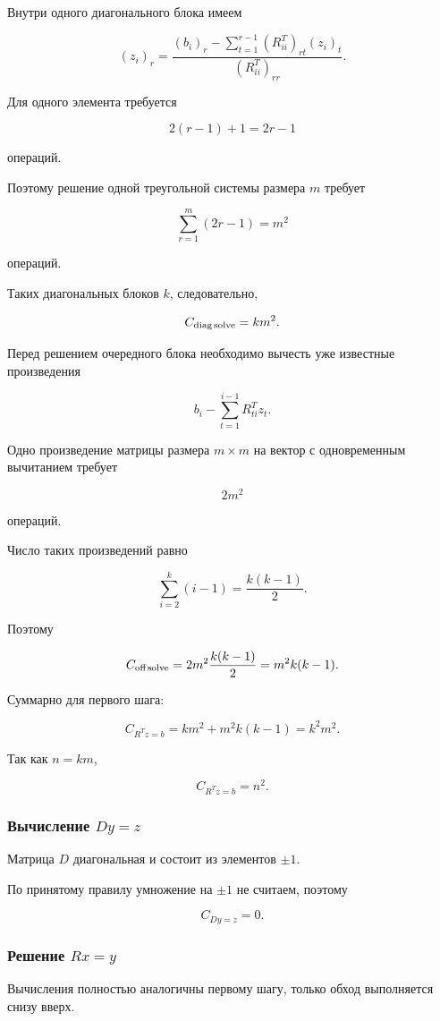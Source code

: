 \documentclass[a4paper,12pt]{article}
\begin{document}
Внутри одного диагонального блока имеем

$$
(z_i)_r
=
\frac{
  (b_i)_r
  -
  \sum_{t=1}^{r-1}
  (R_{ii}^T)_{rt}(z_i)_t
}{
  (R_{ii}^T)_{rr}
}.
$$

Для одного элемента требуется

$$
2(r-1)+1=2r-1
$$

операций.

Поэтому решение одной треугольной системы размера \(m\) требует

$$
\sum_{r=1}^{m}(2r-1)=m^2
$$

операций.

Таких диагональных блоков \(k\), следовательно,

$$
C_{\text{diag\,solve}}=km^2.
$$

Перед решением очередного блока необходимо вычесть уже известные произведения

$$
b_i
-
\sum_{t=1}^{i-1}R_{ti}^{T}z_t.
$$

Одно произведение матрицы размера \(m\times m\) на вектор с одновременным вычитанием требует

$$
2m^2
$$

операций.

Число таких произведений равно

$$
\sum_{i=2}^{k}(i-1)
=
\frac{k(k-1)}2.
$$

Поэтому

$$
C_{\text{off\,solve}}
=
2m^2\frac{k(k-1)}2
=
m^2k(k-1).
$$

Суммарно для первого шага:

$$
C_{R^Tz=b}
=
km^2+m^2k(k-1)
=
k^2m^2.
$$

Так как \(n=km\),

$$
C_{R^Tz=b}=n^2.
$$

\subsubsection{Вычисление \(Dy=z\)}

Матрица \(D\) диагональная и состоит из элементов \(\pm1\).

По принятому правилу умножение на \(\pm1\) не считаем, поэтому

$$
C_{Dy=z}=0.
$$

\subsubsection{Решение \(Rx=y\)}

Вычисления полностью аналогичны первому шагу, только обход выполняется снизу вверх.
\end{document}
